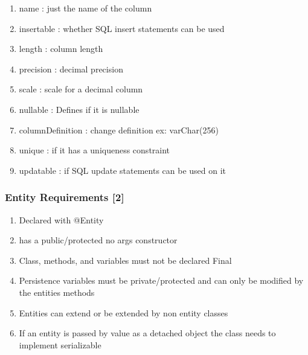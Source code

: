 \documentclass[11pt]{article}
\begin{document}
\begin{enumerate}
\begin{enumerate}
\item name : just the name of the column
\label{sec:orgbb45e5d}
\item insertable : whether SQL insert statements can be used
\label{sec:org8ed6b86}
\item length : column length
\label{sec:orga0d77a8}
\item precision : decimal precision
\label{sec:org2253097}
\item scale : scale for a decimal column
\label{sec:org6e154ec}
\item nullable : Defines if it is nullable
\label{sec:orgea1c7d9}
\item columnDefinition : change definition ex: varChar(256)
\label{sec:org58810cb}
\item unique : if it has a uniqueness constraint
\label{sec:orgf49fea8}
\item updatable : if SQL update statements can be used on it
\label{sec:org67558c4}
\end{enumerate}
\end{enumerate}

\subsubsection{Entity Requirements [2]}
\label{sec:orgc06b7f5}
\begin{enumerate}
\item Declared with @Entity
\label{sec:org0eda211}
\item has a public/protected no args constructor
\label{sec:org9921334}
\item Class, methods, and variables must not be declared Final
\label{sec:org35af7f2}
\item Persistence variables must be private/protected and can only be modified by the entities methods
\label{sec:org033e42e}
\item Entities can extend or be extended by non entity classes
\label{sec:org0fd55e1}
\item If an entity is passed by value as a detached object the class needs to implement serializable
\label{sec:orga901498}
\end{enumerate}
\end{document}

